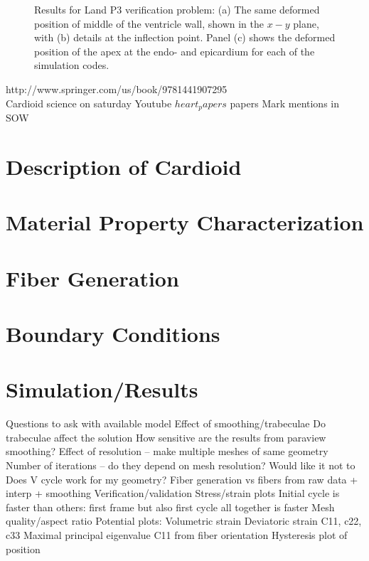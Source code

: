 \begin{figure}[ht!]
%
\caption{Results for Land P3 verification problem: (a) The same deformed position of middle of the ventricle wall, shown in the $x-y$ plane, with (b) details at the inflection point. Panel (c) shows the deformed position of the apex at the endo- and epicardium for each of the simulation codes.}
\label{fig:land3.2}
\end{figure}


{http://www.springer.com/us/book/9781441907295} \\
Cardioid science on saturday Youtube
$heart_papers$
papers Mark mentions in SOW

\section{Description of Cardioid}
\label{Description of Cardioid}

\section{Material Property Characterization}
\label{Material Property Characterization}

\section{Fiber Generation}
\label{Simulation}

\section{Boundary Conditions}
\label{Boundary Conditions}

\section{Simulation/Results}
\label{Simulation/Results}


Questions to ask with available model
Effect of smoothing/trabeculae
Do trabeculae affect the solution
How sensitive are the results from paraview smoothing?
Effect of resolution – make multiple meshes of same geometry
Number of iterations – do they depend on mesh resolution? Would like it not to 
Does V cycle work for my geometry?
Fiber generation vs fibers from raw data + interp + smoothing
Verification/validation
Stress/strain plots
Initial cycle is faster than others: first frame but also first cycle all together is faster
Mesh quality/aspect ratio
Potential plots:	
Volumetric strain
Deviatoric strain
C11, c22, c33
Maximal principal eigenvalue
C11 from fiber orientation
Hysteresis plot of position

